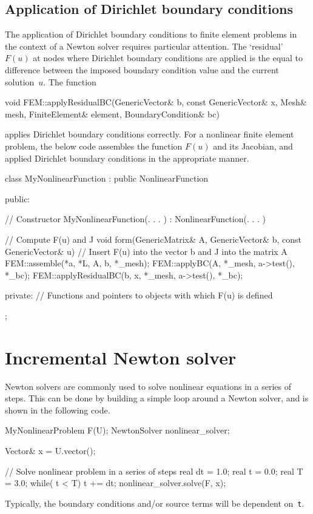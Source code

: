 \subsection{Application of Dirichlet boundary conditions}
%
The application of Dirichlet boundary conditions to finite element
problems in the context of a Newton solver requires particular 
attention. The `residual' $F(u)$ at nodes where Dirichlet boundary
conditions are applied is the equal to difference between the 
imposed boundary condition value and the current solution~$u$.
The function 
\begin{code}
void FEM::applyResidualBC(GenericVector& b, 
           const GenericVector& x, Mesh& mesh,
           FiniteElement& element, BoundaryCondition& bc)
\end{code}
applies Dirichlet boundary conditions correctly. For a nonlinear
finite element problem, the below code assembles the function $F(u)$
and its Jacobian, and applied Dirichlet boundary conditions in the
appropriate manner.
%
\begin{code}
class MyNonlinearFunction : public NonlinearFunction
{
public: 
  
  // Constructor 
  MyNonlinearFunction(. . . ) : NonlinearFunction(. . . ) {}
  
  // Compute F(u) and J 
  void form(GenericMatrix& A, GenericVector& b, 
            const GenericVector& u)
  {
    // Insert F(u) into the vector b and J into the matrix A 
    FEM::assemble(*a, *L, A, b, *_mesh);
    FEM::applyBC(A, *_mesh, a->test(), *_bc);
    FEM::applyResidualBC(b, x, *_mesh, a->test(), *_bc);
  }

private:
  // Functions and pointers to objects with which F(u) is defined
};
\end{code}

\section{Incremental Newton solver}
%
Newton solvers are commonly used to solve nonlinear equations in a series 
of steps. This can be done by building a simple loop around a Newton solver,
and is shown in the following code.
%
\begin{code}
MyNonlinearProblem F(U);
NewtonSolver nonlinear_solver;

Vector& x = U.vector();

// Solve nonlinear problem in a series of steps
real dt = 1.0; real t  = 0.0; real T  = 3.0;
while( t < T)
{
  t += dt;
  nonlinear_solver.solve(F, x);
}
\end{code}
%
Typically, the boundary conditions and/or source terms will be dependent 
on~\texttt{t}.
